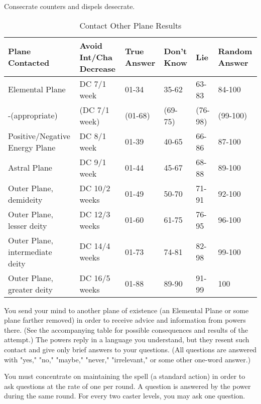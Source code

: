 \begin{multicols}{2}
\begin{small}
\smallskip\noindent Consecrate counters and dispels desecrate.


\begin{center}
\begin{table*}[b!]
\caption{Contact Other Plane Results}
\begin{tabular}{l|p{1.2in}llll}
Plane Contacted & Avoid Int/Cha Decrease & True Answer & Don't Know & Lie & Random Answer \\ \hline
Elemental Plane & DC 7/1 week & 01-34 & 35-62 & 63-83 & 84-100 \\
 -(appropriate) & (DC 7/1 week) & (01-68) & (69-75) & (76-98) & (99-100) \\
Positive/Negative Energy Plane & DC 8/1 week & 01-39 & 40-65 & 66-86 & 87-100 \\
Astral Plane & DC 9/1 week & 01-44 & 45-67 & 68-88 & 89-100 \\
Outer Plane, demideity & DC 10/2 weeks & 01-49 & 50-70 & 71-91 & 92-100 \\
Outer Plane, lesser deity & DC 12/3 weeks & 01-60 & 61-75 & 76-95 & 96-100 \\
Outer Plane, intermediate deity & DC 14/4 weeks & 01-73 & 74-81 & 82-98 & 99-100 \\
Outer Plane, greater deity & DC 16/5 weeks & 01-88 & 89-90 & 91-99 & 100 \\
\end{tabular}
\end{table*}
\end{center}

\noindent You send your mind to another plane of existence (an Elemental Plane or some plane farther removed) in order to receive advice and information from powers there. (See the accompanying table for possible consequences and results of the attempt.) The powers reply in a language you understand, but they resent such contact and give only brief answers to your questions. (All questions are answered with "yes," "no," "maybe," "never," "irrelevant," or some other one-word answer.)

\smallskip\noindent You must concentrate on maintaining the spell (a standard action) in order to ask questions at the rate of one per round. A question is answered by the power during the same round. For every two caster levels, you may ask one question.


\end{small}
\end{multicols}
